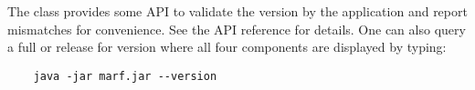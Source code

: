 The  class provides some API to validate the version
by the application and report mismatches for convenience. See the API
reference for details. One can also query a full  or 
 release for version where all four components
are displayed by typing:

\begin{verbatim}
    java -jar marf.jar --version
\end{verbatim}

